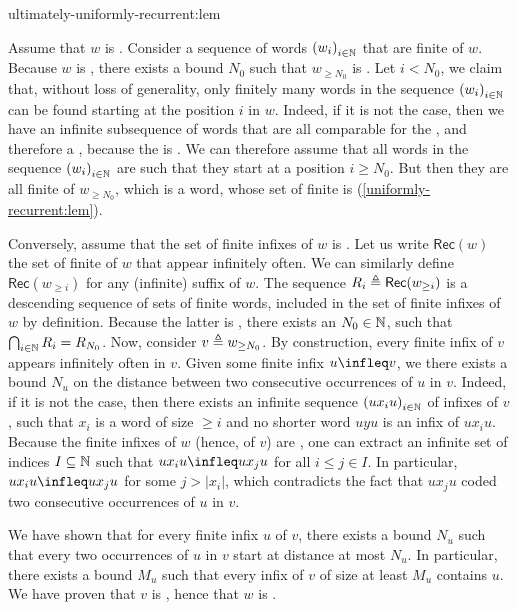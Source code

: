 \begin{proofof}{ultimately-uniformly-recurrent:lem}

    Assume that $w$ is . Consider a sequence
    of words $\seqof{w_i}[i \in \Nat]$ that are finite  of $w$. Because $w$ is
    , there exists a bound $N_0$ such that
    $w_{\geq N_0}$ is . Let $i < N_0$, we claim that,
    without loss of generality, only finitely many words in the sequence
    $\seqof{w_i}[i \in \Nat]$ can be found starting at the position $i$ in $w$. Indeed, if
    it is not the case, then we have an infinite subsequence of words that are
    all comparable for the , and therefore a , because the  is . We can
    therefore assume that all words in the sequence $\seqof{w_i}[i \in \Nat]$ are such that
    they start at a position $i \geq N_0$. But then they are all finite
     of $w_{\geq N_0}$, which is a  word,
    whose set of finite  is 
    (\cref{uniformly-recurrent:lem}).

    Conversely, assume that the set of finite infixes of $w$ is
    . Let us write $\mathsf{Rec}(w)$ the set of finite
     of $w$ that appear infinitely often. We can similarly define
    $\mathsf{Rec}(w_{\geq i})$ for any (infinite) suffix of $w$. The sequence
    $R_i \triangleq \mathsf{Rec}(w_{\geq i})$ is a descending sequence of  sets of finite words, included in the set of finite infixes of $w$
    by definition. Because the latter is , there exists
    an $N_0 \in \mathbb{N}$, such that $\bigcap_{i \in \mathbb{N}} R_i = R_{N_0}$.
    Now, consider $v \triangleq w_{\geq N_0}$. By construction, 
    every finite infix of $v$ 
    appears infinitely often in $v$. 
    Given
    some finite infix $u \infleq v$, we 
    there exists a bound $N_u$
    on the distance
    between two consecutive occurrences of $u$ in $v$.
    Indeed, if it is not the case, then there exists an infinite sequence
    $\seqof{u x_i u}[i \in \Nat]$ of infixes of $v$, such that $x_i$ is a word
    of size $\geq i$
    and no shorter word $u y u$ is an infix of $u x_i u$.
    Because the finite infixes of $w$ (hence, of $v$) are ,
    one can extract an infinite set of indices $I \subseteq \mathbb{N}$
    such that $u x_i u \infleq u x_{j} u$ for all $i \leq j \in I$.
    In particular, $u x_i u \infleq u x_{j} u$ for some $j > |x_i|$, 
    which contradicts the fact that $u x_j u$ coded two consecutive
    occurrences of $u$ in $v$.

    We have shown that for every finite infix $u$ of $v$, there exists a bound
    $N_u$ such that every two occurrences of $u$ in $v$ start at distance at
    most $N_u$. In particular, there exists a bound $M_u$ such that every infix
    of $v$ of size at least $M_u$ contains $u$. We have proven that
    $v$ is , hence that $w$ is .
\end{proofof}


